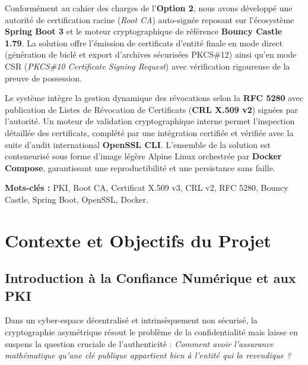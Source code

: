 \documentclass[12pt,a4paper]{report}
\begin{document}
Conformément au cahier des charges de l'\textbf{Option 2}, nous avons développé une autorité de certification racine (\textit{Root CA}) auto-signée reposant sur l'écosystème \textbf{Spring Boot 3} et le moteur cryptographique de référence \textbf{Bouncy Castle 1.79}. La solution offre l'émission de certificats d'entité finale en mode direct (génération de biclé et export d'archives sécurisées PKCS\#12) ainsi qu'en mode CSR (\textit{PKCS\#10 Certificate Signing Request}) avec vérification rigoureuse de la preuve de possession. 

Le système intègre la gestion dynamique des révocations selon la \textbf{RFC 5280} avec publication de Listes de Révocation de Certificats (\textbf{CRL X.509 v2}) signées par l'autorité. Un moteur de validation cryptographique interne permet l'inspection détaillée des certificats, complété par une intégration certifiée et vérifiée avec la suite d'audit international \textbf{OpenSSL CLI}. L'ensemble de la solution est conteneurisé sous forme d'image légère Alpine Linux orchestrée par \textbf{Docker Compose}, garantissant une reproductibilité et une persistance sans faille.

\vspace{0.8cm}
\noindent \textbf{Mots-clés :} PKI, Root CA, Certificat X.509 v3, CRL v2, RFC 5280, Bouncy Castle, Spring Boot, OpenSSL, Docker.

\vspace{1cm}
\tableofcontents
\listoffigures
\listoftables

\clearpage
{}

\chapter{Contexte et Objectifs du Projet}

\section{Introduction à la Confiance Numérique et aux PKI}
Dans un cyber-espace décentralisé et intrinsèquement non sécurisé, la cryptographie asymétrique résout le problème de la confidentialité mais laisse en suspens la question cruciale de l'authenticité : \textit{Comment avoir l'assurance mathématique qu'une clé publique appartient bien à l'entité qui la revendique ?}
\end{document}
